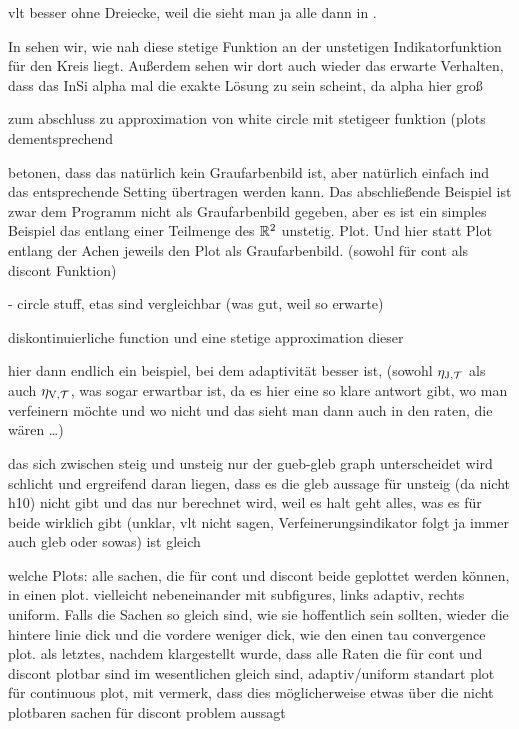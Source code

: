  vlt besser ohne Dreiecke, weil die sieht man
ja alle dann in .

In  sehen wir, wie nah diese stetige Funktion 
an der unstetigen Indikatorfunktion für den Kreis liegt.
Außerdem sehen wir dort auch wieder das erwarte Verhalten, dass das InSi
alpha mal die exakte Lösung zu sein scheint, da alpha hier groß

zum abschluss zu approximation von white circle mit stetigeer funktion (plots
dementsprechend

betonen, dass das natürlich kein Graufarbenbild ist, aber natürlich einfach
ind das entsprechende Setting übertragen werden kann.
Das abschließende Beispiel ist zwar dem Programm nicht als Graufarbenbild 
gegeben, aber es ist ein simples Beispiel das entlang einer Teilmenge des
$\mathbb{R}^2$ unstetig. Plot. Und hier statt Plot entlang der Achen jeweils
den Plot als Graufarbenbild. (sowohl für cont als discont Funktion)

  - circle stuff, etas sind vergleichbar (was gut, weil so erwarte)

diskontinuierliche function und eine stetige approximation dieser

hier dann endlich ein beispiel, bei dem adaptivität besser ist, (sowohl
$\eta_{\textup{J}, \mathcal{T}}$ als auch $\eta_{\textup{V}, \mathcal{T}}$, was sogar erwartbar ist, da es hier eine so klare 
antwort gibt, wo man verfeinern möchte und wo nicht und das sieht man dann
auch in den raten, die wären \ldots)

das sich zwischen steig und unsteig nur der gueb-gleb graph unterscheidet 
wird schlicht und ergreifend daran liegen, dass es die gleb aussage
für unsteig (da nicht h10) nicht gibt und das nur berechnet wird, weil es halt 
geht
alles, was es für beide wirklich gibt (unklar, vlt nicht sagen,
Verfeinerungsindikator folgt ja immer auch gleb oder sowas) ist gleich


welche Plots: 
alle sachen, die für cont und discont beide geplottet werden können, in einen
plot. vielleicht nebeneinander mit subfigures, links adaptiv, rechts uniform.
Falls die Sachen so gleich sind, wie sie hoffentlich sein sollten, wieder
die hintere linie dick und die vordere weniger dick, wie den einen tau
convergence plot. 
als letztes, nachdem klargestellt wurde, dass alle Raten die für cont und
discont plotbar sind im wesentlichen gleich sind, adaptiv/uniform standart plot
für continuous plot, mit vermerk, dass dies möglicherweise etwas über die nicht
plotbaren sachen für discont problem aussagt

